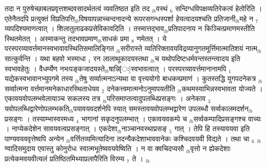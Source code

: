 \documentclass[article,12pt,a4paper]{memoir}%
\newcounter{parCount}
\begin{document}
	  
	  \pstart \leavevmode%
	तदा न पुरुषेच्छाबलप्रवृत्तशब्दवसादर्थतत्वं व्यवतिष्ठत इति तद {\tiny $_{lb}$}वस्थं {\tiny $_{6}$} सन्दिग्धविपक्षव्यतिरेकत्वं हेतोरिति । एतेनैतदपि प्रत्युक्तं विप्रतिपत्ति{\tiny $_{lb}$}विषयापन्नाच्चन्दनादन्ये रूपरसगन्धस्पर्शा हेयत्वादयश्चति प्रतिजानी{\tiny $_{lb}$}महे न {\tiny $_{7}$} व्यपदिश्यमाणत्वात् । शिलातुलाढकप्रसेविकावदिति । तस्मात्तद्भाव{\tiny $_{lb}$}प्रतिपादनाय न किञ्चित्प्रमाणमस्तीति स्थितमेतत् । अस्माकन्तु तदभावप्रमाण{\tiny $_{lb}$}साधकं प्रमा {\tiny $_{8}$} \leavevmode{} णमेतत् । ये परस्परव्यावर्त्तमानस्वभावावस्थितिसमालिङ्गित {\tiny $_{lb}$}सरीरास्ते व्यतिरिक्तावयविद्रव्यानुगतमूर्त्तिमात्मातिशयं नात्म{\tiny $_{lb}$}सात्कुर्वन्ति । यथा बहवो भस्माधा {\tiny $_{1}$} रन  लालाथूकादयस्तथा {\tiny $_{lb}$}च यथोपदिष्टधर्मवन्तस्तन्त्वादय इति स्वभावहेतुः । वैधर्म्येण नभःपङ्कजादयस्ते{\tiny $_{lb}$}षान्नि[ः]स्वभावत्वात् । परस्परव्यावर्त्तमानानामपि {\tiny $_{1}$} यद्येकस्वभावानभ्युपगमे तस्य {\tiny $_{lb}$}तेषु सर्व्वात्मनाऽन्यथा वा वृत्त्ययोगो बाधकम्प्रमाणं । कुतस्तद्धि युगपदनेकत्र {\tiny $_{lb}$}सर्व्वात्मना वर्त्तमानमनेकाधारस्थिताधेयव {\tiny $_{2}$} दनेकत्त्वमात्मनोऽनुमापयतीति {\tiny $_{lb}$}कथमस्याभिन्नस्वभावता योज्यते । एकावयवोपलम्भवेलायाञ्च सकलस्य तत्र {\tiny $_{lb}$}परिसमाप्तत्वादुपलब्धिप्रसङ्गः । अनेकाव {\tiny $_{3}$} यवोपलब्धिद्वारेणोपलम्भकति{\tiny $_{lb}$}पयावयवदर्शनेपि स्यात् समस्तावयवोपलम्भद्वारेण उपलब्धौ सर्व्वकालमदर्शन{\tiny $_{lb}$}प्रसङ्गः । तस्याम्भास्वरमध्य {\tiny $_{4}$} भागानां सकृदनुपलम्भात् । एकावयवकम्पे च {\tiny $_{lb}$}सर्व्वकम्पादिप्रसङ्गश्च वाच्यः । नाप्येकदेशेन सावयवत्वप्रसङ्गात् । एकदेशा{\tiny $_{lb}$}नाञ्चानवस्थाप्रसङ् {\tiny $_{5}$} गात् । तेपि हि तस्यावयवा इति पाण्यवयववृत्तेष्वपि अन्येन {\tiny $_{lb}$}वर्त्तितव्यमित्यादिना तदन्यैकदेशाभाववानेकः कश्चिदवयवी विद्यते । तथा चा {\tiny $_{6}$} {\tiny $_{lb}$}ण्वादिसमुदाय एवास्तु कोनुरोधः स्वात्मभूतेष्ववयवेष्विति । न वा क्वचिदप्यसौ {\tiny $_{lb}$}वृत्तो न ह्येकदेशाः प्रत्येकमवयवीत्यलं प्रतिष्ठितमिथ्याप्रलापैरिति विरम्य {\tiny $_{7}$} ते ।
	{}
	\pend%
      {\tiny $_{lb}$}
\end{document}
